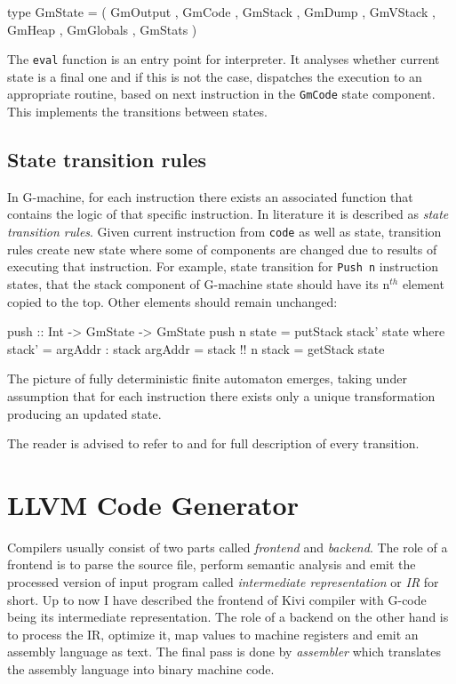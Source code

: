 \documentclass[12pt,a4paper]{report}
\begin{document}
\vspace*{0.2in}
\begin{code}[style=haskell]
  type GmState = ( GmOutput
                 , GmCode
                 , GmStack
                 , GmDump
                 , GmVStack
                 , GmHeap
                 , GmGlobals
                 , GmStats )
\end{code}

The \texttt{eval} function is an entry point for interpreter. It analyses
whether current state is a final one and if this is not the case, dispatches
the execution to an appropriate routine, based on next instruction in the
\texttt{GmCode} state component. This implements the transitions between states.

\subsection{State transition rules}
In G-machine, for each instruction there exists an associated function that
contains the logic of that specific instruction. In literature it is described
as \textit{state transition rules}. Given current instruction from
\texttt{code} as well as state, transition rules create new state where some of
components are changed due to results of executing that instruction. For
example, state transition for \texttt{Push n} instruction states, that the
stack component of G-machine state should have its n$^{th}$ element copied to
the top. Other elements should remain unchanged:

\vspace*{0.2in}
\begin{code}[style=haskell]
  push :: Int -> GmState -> GmState
  push n state =
      putStack stack' state
      where
          stack' = argAddr : stack
          argAddr = stack !! n
          stack = getStack state
\end{code}

The picture of fully deterministic finite automaton emerges, taking under
assumption that for each instruction there exists only a unique transformation
producing an updated state.

The reader is advised to refer to \cite{Jon87} and \cite{JonLes00} for full
description of every transition.

\section{LLVM Code Generator}
\label{sec:llvm_codegen}
Compilers usually consist of two parts called \textit{frontend} and
\textit{backend}. The role of a frontend is to parse the source file, perform
semantic analysis and emit the processed version of input program called
\textit{intermediate representation} or \textit{IR} for short. Up to now I have
described the frontend of Kivi compiler with G-code being its intermediate
representation. The role of a backend on the other hand is to process the IR,
optimize it, map values to machine registers and emit an assembly language as
text. The final pass is done by \textit{assembler} which translates the
assembly language into binary machine code.
\end{document}
